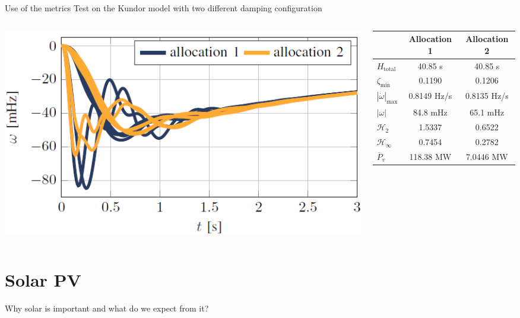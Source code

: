 \documentclass[aspectratio=169, 12pt]{beamer}
\begin{document}
\begin{frame}{Use of the metrics}
  Test on the Kundor model with two different damping configuration
  \begin{columns}
    \begin{column}{0.5\columnwidth}
      \includegraphics[width = \columnwidth]{figure/kundor_frequency.png}
    \end{column}
    \begin{column}{0.5\columnwidth}
      \begin{table}[h!]
        \centering
        \begin{tabular}{lcc}
        \toprule
        & Allocation 1 & Allocation 2 \\
        \midrule
        $H_{\text{total}}$ & 40.85 s & 40.85 s \\
        $\zeta_{\text{min}}$ & 0.1190 & 0.1206 \\
        $\left|\dot{\omega}\right|_{\max}$ & 0.8149 Hz/s & 0.8135 Hz/s \\
        $\left|\omega\right|$ & 84.8 mHz & 65.1 mHz \\
        $\mathcal{H}_2 $ & 1.5337 & 0.6522 \\
        $\mathcal{H}_{\infty} $ & 0.7454 & 0.2782 \\
        $\overline{P}_v$ & 118.38 MW & 7.0446 MW \\
        \bottomrule
        \end{tabular}
      
        \label{table:allocations}
        \end{table}
    \end{column}
  \end{columns}
\end{frame}

\section{Solar PV}
\begin{frame}
  Why solar is important and what do we expect from it?
\end{frame}
\end{document}
